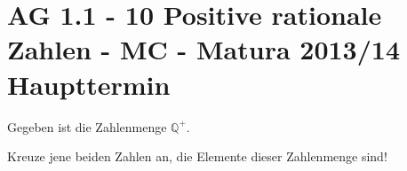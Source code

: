 \section{AG 1.1 - 10 Positive rationale Zahlen - MC - Matura 2013/14 Haupttermin}

\begin{beispiel}[AG 1.1]{1} %
				Gegeben ist die Zahlenmenge $\mathbb{Q}^+$.
				
				Kreuze jene beiden Zahlen an, die Elemente dieser Zahlenmenge sind!\leer
				

\end{beispiel}